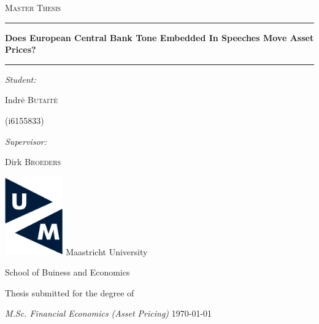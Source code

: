 \begin{titlepage}
    \begin{center}
        \vspace*{0.5cm}
        \textsc{\large Master Thesis}
        \vspace{0.5cm}
        \hrule
        \vspace{0.4cm}
        \huge{\bfseries Does European Central Bank Tone Embedded In Speeches Move Asset Prices?}
        \vspace{0.5cm} 
        \hrule
        \vspace{1.5cm} 
        \begin{minipage}[t]{7cm}
            \flushleft \large
                \emph{Student:}

                {Indrė \textsc{Butaitė}}

                (i6155833)

        \end{minipage}
        \hfill
        \begin{minipage}[t]{7cm}
            \flushright \large
                \emph{Supervisor:}

                {Dirk \textsc{Broeders}}
        \end{minipage}
        \vfill
        \includegraphics[width=2.5cm]{resources/University_Crest.png}
        \vspace{1cm}
        \vfill
        \large
            Maastricht University

            School of Buiness and Economics

            \vspace{2cm}

            Thesis submitted for the degree of

            \emph{M.Sc. Financial Economics (Asset Pricing)}
        \vspace{1.5cm}
        \vfill
        {\large \today}


    \end{center}
\end{titlepage}